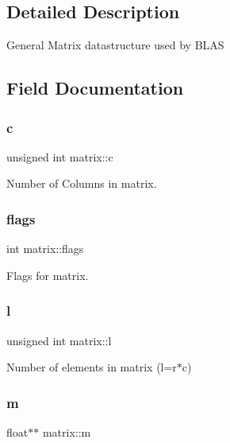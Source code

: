 \subsection{Detailed Description}
General Matrix datastructure used by B\+L\+AS 

\subsection{Field Documentation}
\mbox{\label{structmatrix_a9499b963be4febd5b909822a4d0ae290}} 
\subsubsection{\texorpdfstring{c}{c}}
{\footnotesize\ttfamily unsigned int matrix\+::c}



Number of Columns in matrix. 

\mbox{\label{structmatrix_ab45b487b5fbdfe6df519d054d5acb245}} 
\subsubsection{\texorpdfstring{flags}{flags}}
{\footnotesize\ttfamily int matrix\+::flags}



Flags for matrix. 

\mbox{\label{structmatrix_a5be40caa3b21e52f4c60b0846f1bd6b1}} 
\subsubsection{\texorpdfstring{l}{l}}
{\footnotesize\ttfamily unsigned int matrix\+::l}



Number of elements in matrix (l=r$\ast$c) 

\mbox{\label{structmatrix_afee3aefd63edf15984ec01e14dcfc8ec}} 
\subsubsection{\texorpdfstring{m}{m}}
{\footnotesize\ttfamily float$\ast$$\ast$ matrix\+::m}



